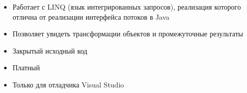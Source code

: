 \begin{frame}
\frametitle{\insertsection} 
\framesubtitle{\insertsubsection}
\begin{itemize}
	\item Работает с LINQ (язык интегрированных запросов), реализация которого отлична от реализации интерфейса потоков в Java
	\item Позволяет увидеть трансформации объектов и промежуточные результаты
	\item Закрытый исходный код
	\item Платный
	\item Только для отладчика Visual Studio
\end{itemize}
\end{frame}
